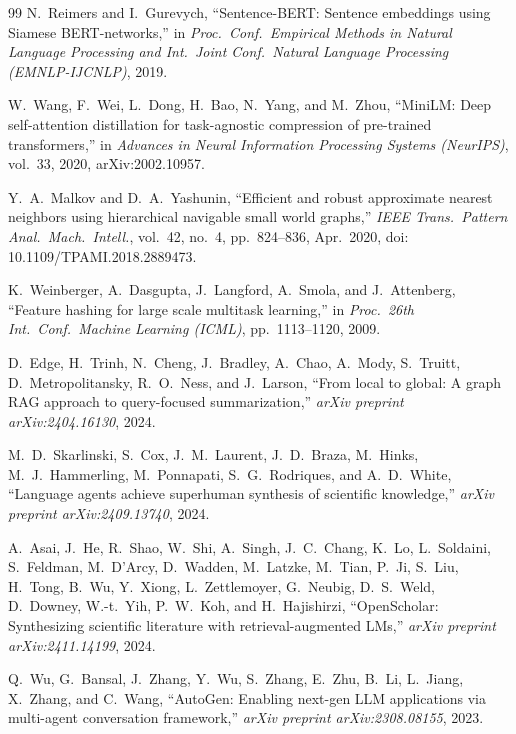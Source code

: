 \documentclass[conference]{IEEEtran}
\begin{document}
\begin{thebibliography}{99}
N.~Reimers and I.~Gurevych, ``Sentence-BERT: Sentence embeddings using Siamese BERT-networks,'' in \emph{Proc.\ Conf.\ Empirical Methods in Natural Language Processing and Int.\ Joint Conf.\ Natural Language Processing (EMNLP-IJCNLP)}, 2019.

W.~Wang, F.~Wei, L.~Dong, H.~Bao, N.~Yang, and M.~Zhou, ``MiniLM: Deep self-attention distillation for task-agnostic compression of pre-trained transformers,'' in \emph{Advances in Neural Information Processing Systems (NeurIPS)}, vol.~33, 2020, arXiv:2002.10957.

Y.~A.~Malkov and D.~A.~Yashunin, ``Efficient and robust approximate nearest neighbors using hierarchical navigable small world graphs,'' \emph{IEEE Trans.\ Pattern Anal.\ Mach.\ Intell.}, vol.~42, no.~4, pp.~824--836, Apr.~2020, doi: 10.1109/TPAMI.2018.2889473.

K.~Weinberger, A.~Dasgupta, J.~Langford, A.~Smola, and J.~Attenberg, ``Feature hashing for large scale multitask learning,'' in \emph{Proc.\ 26th Int.\ Conf.\ Machine Learning (ICML)}, pp.~1113--1120, 2009.

D.~Edge, H.~Trinh, N.~Cheng, J.~Bradley, A.~Chao, A.~Mody, S.~Truitt, D.~Metropolitansky, R.~O.~Ness, and J.~Larson, ``From local to global: A graph RAG approach to query-focused summarization,'' \emph{arXiv preprint arXiv:2404.16130}, 2024.

M.~D.~Skarlinski, S.~Cox, J.~M.~Laurent, J.~D.~Braza, M.~Hinks, M.~J.~Hammerling, M.~Ponnapati, S.~G.~Rodriques, and A.~D.~White, ``Language agents achieve superhuman synthesis of scientific knowledge,'' \emph{arXiv preprint arXiv:2409.13740}, 2024.

A.~Asai, J.~He, R.~Shao, W.~Shi, A.~Singh, J.~C.~Chang, K.~Lo, L.~Soldaini, S.~Feldman, M.~D'Arcy, D.~Wadden, M.~Latzke, M.~Tian, P.~Ji, S.~Liu, H.~Tong, B.~Wu, Y.~Xiong, L.~Zettlemoyer, G.~Neubig, D.~S.~Weld, D.~Downey, W.-t.~Yih, P.~W.~Koh, and H.~Hajishirzi, ``OpenScholar: Synthesizing scientific literature with retrieval-augmented LMs,'' \emph{arXiv preprint arXiv:2411.14199}, 2024.

Q.~Wu, G.~Bansal, J.~Zhang, Y.~Wu, S.~Zhang, E.~Zhu, B.~Li, L.~Jiang, X.~Zhang, and C.~Wang, ``AutoGen: Enabling next-gen LLM applications via multi-agent conversation framework,'' \emph{arXiv preprint arXiv:2308.08155}, 2023.


\end{thebibliography}
\end{document}
